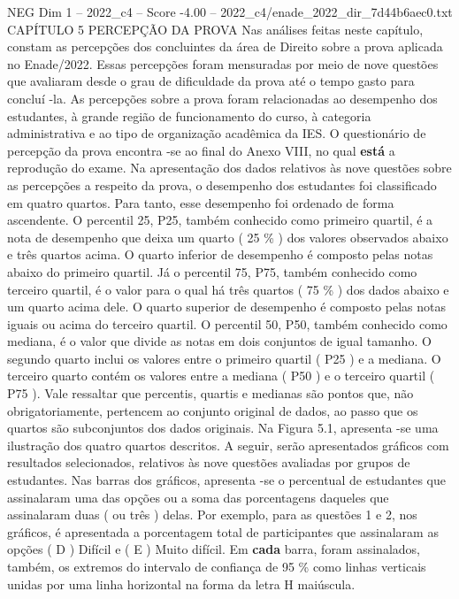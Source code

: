 \begin{textsample}{NEG Dim 1 – 2022\_c4 – Score -4.00 – 2022\_c4/enade\_2022\_dir\_7d44b6aec0.txt}  \label{ex:f1_neg_177}
CAPÍTULO 5 PERCEPÇÃO DA PROVA Nas análises feitas neste capítulo, constam as percepções dos concluintes da área de Direito sobre a prova aplicada no Enade/2022.
Essas percepções foram mensuradas por meio de nove questões que avaliaram desde o grau de dificuldade da prova até o tempo gasto para concluí -la.
As percepções sobre a prova foram relacionadas ao desempenho dos estudantes, à grande região de funcionamento do curso, à categoria administrativa e ao tipo de organização acadêmica da IES.
O questionário de percepção da prova encontra -se ao final do Anexo VIII, no qual \textbf{está} a reprodução do exame.
Na apresentação dos dados relativos às nove questões sobre as percepções a respeito da prova, o desempenho dos estudantes foi classificado em quatro quartos.
Para tanto, esse desempenho foi ordenado de forma ascendente.
O percentil 25, P25, também conhecido como primeiro quartil, é a nota de desempenho que deixa um quarto ( 25 \% ) dos valores observados abaixo e três quartos acima.
O quarto inferior de desempenho é composto pelas notas abaixo do primeiro quartil.
Já o percentil 75, P75, também conhecido como terceiro quartil, é o valor para o qual há três quartos ( 75 \% ) dos dados abaixo e um quarto acima dele.
O quarto superior de desempenho é composto pelas notas iguais ou acima do terceiro quartil.
O percentil 50, P50, também conhecido como mediana, é o valor que divide as notas em dois conjuntos de igual tamanho.
O segundo quarto inclui os valores entre o primeiro quartil ( P25 ) e a mediana.
O terceiro quarto contém os valores entre a mediana ( P50 ) e o terceiro quartil ( P75 ).
Vale ressaltar que percentis, quartis e medianas são pontos que, não obrigatoriamente, pertencem ao conjunto original de dados, ao passo que os quartos são subconjuntos dos dados originais.
Na Figura 5.1, apresenta -se uma ilustração dos quatro quartos descritos.
A seguir, serão apresentados gráficos com resultados selecionados, relativos às nove questões avaliadas por grupos de estudantes.
Nas barras dos gráficos, apresenta -se o percentual de estudantes que assinalaram uma das opções ou a soma das porcentagens daqueles que assinalaram duas ( ou três ) delas.
Por exemplo, para as questões 1 e 2, nos gráficos, é apresentada a porcentagem total de participantes que assinalaram as opções ( D ) Difícil e ( E ) Muito difícil.
Em \textbf{cada} barra, foram assinalados, também, os extremos do intervalo de confiança de 95 \% como linhas verticais unidas por uma linha horizontal na forma da letra H maiúscula.

\end{textsample}
